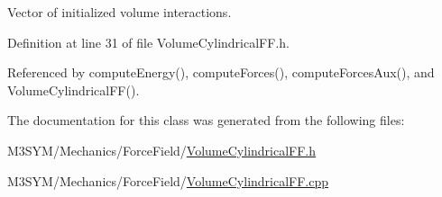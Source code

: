 Vector of initialized volume interactions. 



Definition at line 31 of file Volume\+Cylindrical\+F\+F.\+h.



Referenced by compute\+Energy(), compute\+Forces(), compute\+Forces\+Aux(), and Volume\+Cylindrical\+F\+F().



The documentation for this class was generated from the following files\+:\begin{DoxyCompactItemize}
\item 
M3\+S\+Y\+M/\+Mechanics/\+Force\+Field/\hyperlink{VolumeCylindricalFF_8h}{Volume\+Cylindrical\+F\+F.\+h}\item 
M3\+S\+Y\+M/\+Mechanics/\+Force\+Field/\hyperlink{VolumeCylindricalFF_8cpp}{Volume\+Cylindrical\+F\+F.\+cpp}\end{DoxyCompactItemize}
